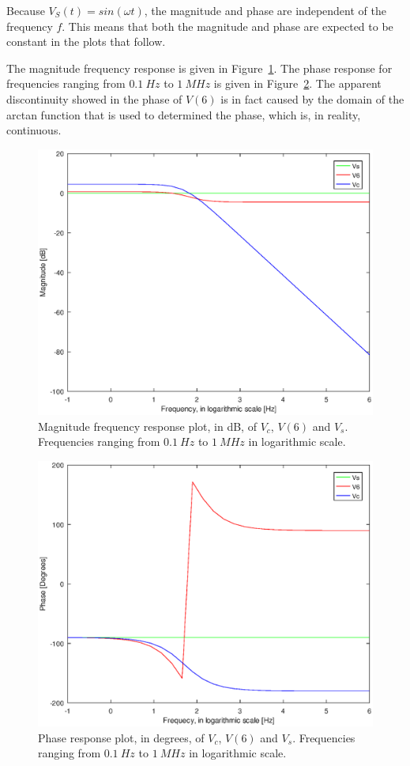 Because $V_S(t) = sin(\omega t)$, the magnitude and phase are independent of the frequency $f$. This means that both the magnitude and phase are expected to be constant in the plots that follow.

The magnitude frequency response is given in Figure~\ref{fig:mag}.
The phase response for frequencies ranging from $0.1~Hz$ to $1~MHz$ is given in Figure~\ref{fig:phase}. The apparent discontinuity showed in the phase of $V(6)$ is in fact caused by the domain of the arctan function that is used to determined the phase, which is, in reality, continuous.

\begin{figure}[h] \centering
\includegraphics[width=0.5\linewidth]{magnitude.eps}
	\caption{Magnitude frequency response plot, in dB, of $V_{c}$, $V(6)$ and $V_{s}$. Frequencies ranging from $0.1~Hz$ to $1~MHz$ in logarithmic scale.}
        \label{fig:mag}
\end{figure}


\begin{figure}[h] \centering
\includegraphics[width=0.7\linewidth]{phase.eps}
	\caption{Phase response plot, in degrees, of $V_{c}$, $V(6)$ and $V_{s}$. Frequencies ranging from $0.1~Hz$ to $1~MHz$ in logarithmic scale.}
        \label{fig:phase}
\end{figure}



